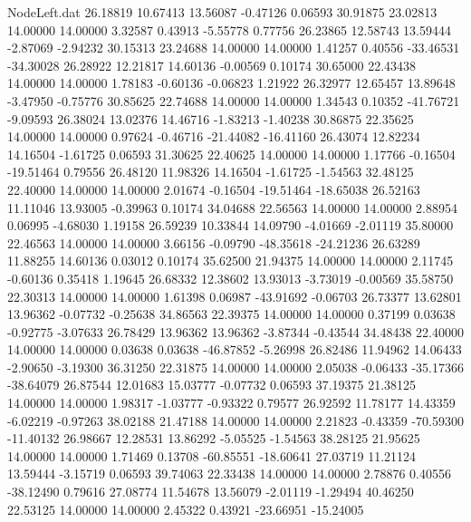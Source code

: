 \begin{filecontents}{NodeLeft.dat}
  26.18819   10.67413   13.56087    -0.47126    0.06593   30.91875   23.02813   14.00000   14.00000    3.32587    0.43913   -5.55778    0.77756
  26.23865   12.58743   13.59444    -2.87069   -2.94232   30.15313   23.24688   14.00000   14.00000    1.41257    0.40556  -33.46531  -34.30028
  26.28922   12.21817   14.60136    -0.00569    0.10174   30.65000   22.43438   14.00000   14.00000    1.78183   -0.60136   -0.06823    1.21922
  26.32977   12.65457   13.89648    -3.47950   -0.75776   30.85625   22.74688   14.00000   14.00000    1.34543    0.10352  -41.76721   -9.09593
  26.38024   13.02376   14.46716    -1.83213   -1.40238   30.86875   22.35625   14.00000   14.00000    0.97624   -0.46716  -21.44082  -16.41160
  26.43074   12.82234   14.16504    -1.61725    0.06593   31.30625   22.40625   14.00000   14.00000    1.17766   -0.16504  -19.51464    0.79556
  26.48120   11.98326   14.16504    -1.61725   -1.54563   32.48125   22.40000   14.00000   14.00000    2.01674   -0.16504  -19.51464  -18.65038
  26.52163   11.11046   13.93005    -0.39963    0.10174   34.04688   22.56563   14.00000   14.00000    2.88954    0.06995   -4.68030    1.19158
  26.59239   10.33844   14.09790    -4.01669   -2.01119   35.80000   22.46563   14.00000   14.00000    3.66156   -0.09790  -48.35618  -24.21236
  26.63289   11.88255   14.60136     0.03012    0.10174   35.62500   21.94375   14.00000   14.00000    2.11745   -0.60136    0.35418    1.19645
  26.68332   12.38602   13.93013    -3.73019   -0.00569   35.58750   22.30313   14.00000   14.00000    1.61398    0.06987  -43.91692   -0.06703
  26.73377   13.62801   13.96362    -0.07732   -0.25638   34.86563   22.39375   14.00000   14.00000    0.37199    0.03638   -0.92775   -3.07633
  26.78429   13.96362   13.96362    -3.87344   -0.43544   34.48438   22.40000   14.00000   14.00000    0.03638    0.03638  -46.87852   -5.26998
  26.82486   11.94962   14.06433    -2.90650   -3.19300   36.31250   22.31875   14.00000   14.00000    2.05038   -0.06433  -35.17366  -38.64079
  26.87544   12.01683   15.03777    -0.07732    0.06593   37.19375   21.38125   14.00000   14.00000    1.98317   -1.03777   -0.93322    0.79577
  26.92592   11.78177   14.43359    -6.02219   -0.97263   38.02188   21.47188   14.00000   14.00000    2.21823   -0.43359  -70.59300  -11.40132
  26.98667   12.28531   13.86292    -5.05525   -1.54563   38.28125   21.95625   14.00000   14.00000    1.71469    0.13708  -60.85551  -18.60641
  27.03719   11.21124   13.59444    -3.15719    0.06593   39.74063   22.33438   14.00000   14.00000    2.78876    0.40556  -38.12490    0.79616
  27.08774   11.54678   13.56079    -2.01119   -1.29494   40.46250   22.53125   14.00000   14.00000    2.45322    0.43921  -23.66951  -15.24005

\end{filecontents}
